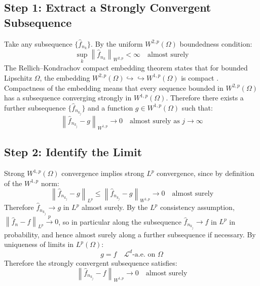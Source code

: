 \documentclass[12pt]{article}
\newcommand{\norm}[1]{\left\| #1 \right\|}
\newcommand{\Wonep}{W^{1,p}(\Omega)}
\newcommand{\Wtwop}{W^{2,p}(\Omega)}
\newcommand{\fn}{\hat{f}_n}
\newcommand{\xrightarrowp}{\xrightarrow{p}}
\begin{document}
	\subsection{Step 1: Extract a Strongly Convergent Subsequence}
	
	Take any subsequence $\{\hat{f}_{n_k}\}$. By the uniform $\Wtwop$
	boundedness condition:
	\begin{equation}
		\sup_k \norm{\hat{f}_{n_k}}_{W^{2,p}} < \infty \quad \text{almost surely}
	\end{equation}
	The Rellich--Kondrachov compact embedding theorem states that for bounded
	Lipschitz $\Omega$, the embedding $W^{2,p}(\Omega) \hookrightarrow\hookrightarrow
	W^{1,p}(\Omega)$ is compact \citep[Theorem~5,~Section~5.7]{evans2010pde}.
	Compactness of the embedding means that every sequence bounded in $\Wtwop$
	has a subsequence converging strongly in $\Wonep$. Therefore there exists a
	further subsequence $\{\hat{f}_{n_{k_j}}\}$ and a function $g \in \Wonep$
	such that:
	\begin{equation}
		\norm{\hat{f}_{n_{k_j}} - g}_{W^{1,p}} \to 0
		\quad \text{almost surely as } j \to \infty
	\end{equation}
	
	\subsection{Step 2: Identify the Limit}
	
	Strong $\Wonep$ convergence implies strong $L^p$ convergence, since by
	definition of the $W^{1,p}$ norm:
	\begin{equation}
		\norm{\hat{f}_{n_{k_j}} - g}_{L^p}
		\leq \norm{\hat{f}_{n_{k_j}} - g}_{W^{1,p}}
		\to 0 \quad \text{almost surely}
	\end{equation}
	Therefore $\hat{f}_{n_{k_j}} \to g$ in $L^p$ almost surely. By the $L^p$
	consistency assumption, $\norm{\fn - f}_{L^p} \xrightarrowp 0$, so in
	particular along the subsequence $\hat{f}_{n_{k_j}} \to f$ in $L^p$ in
	probability, and hence almost surely along a further subsequence if
	necessary. By uniqueness of limits in $L^p(\Omega)$:
	\begin{equation}
		g = f \quad \mathcal{L}^d\text{-a.e.\ on } \Omega
	\end{equation}
	Therefore the strongly convergent subsequence satisfies:
	\begin{equation}
		\norm{\hat{f}_{n_{k_j}} - f}_{W^{1,p}} \to 0
		\quad \text{almost surely}
	\end{equation}
	
\end{document}
